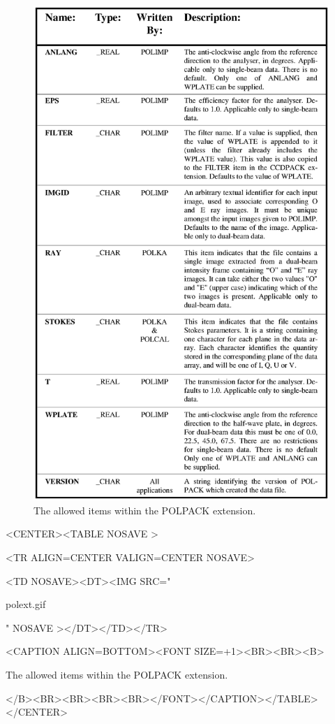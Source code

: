 \documentclass[twoside,11pt]{article}
\newenvironment{latexonly}{}{}
\renewcommand{\_}{\texttt{\symbol{95}}}
\newcommand{\htmlfig}[3]{
   \label{#1}
   \begin{rawhtml} <CENTER><TABLE NOSAVE > \end{rawhtml}
   \begin{rawhtml} <TR ALIGN=CENTER VALIGN=CENTER NOSAVE> \end{rawhtml}
   \begin{rawhtml} <TD NOSAVE><DT><IMG SRC=" \end{rawhtml}
   #2
   \begin{rawhtml} " NOSAVE ></DT></TD></TR> \end{rawhtml}
   \begin{rawhtml} <CAPTION ALIGN=BOTTOM><FONT SIZE=+1><BR><BR><B> \end{rawhtml}
   #3 
   \begin{rawhtml} </B><BR><BR><BR><BR></FONT></CAPTION></TABLE></CENTER> \end{rawhtml}
}
\begin{document}
\begin{latexonly}
  \begin{figure}[htbp]
  \begin{center}
  \includegraphics[clip,scale=0.75]{sun223_figures/polext.eps}
  \caption{The allowed items within the POLPACK extension.}
  \label{fig:polext}
  \end{center}
  \end{figure}
\end{latexonly}

\begin{htmlonly}
\htmlfig{fig:polext}{polext.gif}{
The allowed items within the POLPACK extension.}
\end{htmlonly}
\end{document}
